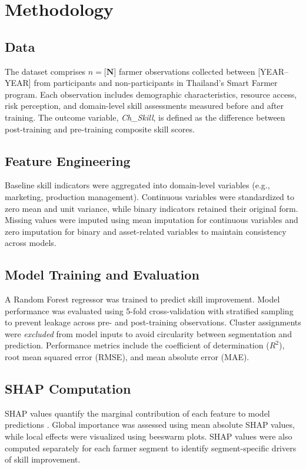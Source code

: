 \section{Methodology}

\subsection{Data}
The dataset comprises $n=\textbf{[N]}$ farmer observations collected between [YEAR--YEAR] from participants and non-participants in Thailand’s Smart Farmer program. Each observation includes demographic characteristics, resource access, risk perception, and domain-level skill assessments measured before and after training. The outcome variable, \textit{Ch\_Skill}, is defined as the difference between post-training and pre-training composite skill scores.

\subsection{Feature Engineering}
Baseline skill indicators were aggregated into domain-level variables (e.g., marketing, production management). Continuous variables were standardized to zero mean and unit variance, while binary indicators retained their original form. Missing values were imputed using mean imputation for continuous variables and zero imputation for binary and asset-related variables to maintain consistency across models.

\subsection{Model Training and Evaluation}
A Random Forest regressor was trained to predict skill improvement. Model performance was evaluated using 5-fold cross-validation with stratified sampling to prevent leakage across pre- and post-training observations. Cluster assignments were \textit{excluded} from model inputs to avoid circularity between segmentation and prediction. Performance metrics include the coefficient of determination ($R^2$), root mean squared error (RMSE), and mean absolute error (MAE).

\subsection{SHAP Computation}
SHAP values quantify the marginal contribution of each feature to model predictions \citep{adadi2018xai}. Global importance was assessed using mean absolute SHAP values, while local effects were visualized using beeswarm plots. SHAP values were also computed separately for each farmer segment to identify segment-specific drivers of skill improvement.


